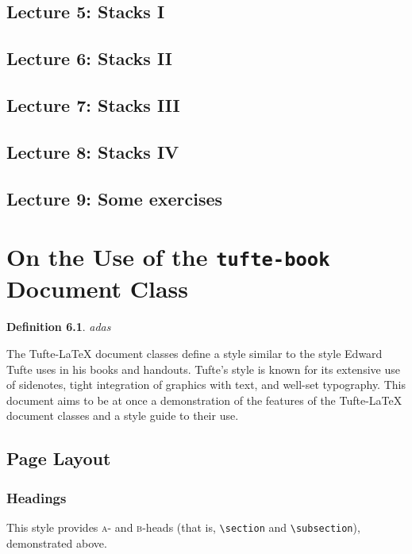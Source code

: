 \documentclass{tufte-book} %
\newcommand{\TL}{Tufte-\LaTeX\xspace}
\numberwithin{dummy}{section}
\newtheorem{dfn}[thm]{Definition}
\begin{document}
\section{Lecture 5: Stacks I}
\section{Lecture 6: Stacks II}
\section{Lecture 7: Stacks III}
\section{Lecture 8: Stacks IV}
\section{Lecture 9: Some exercises}
\chapter[On the Use of the tufte-book Document Class]{On the Use of the \texttt{tufte-book} Document Class}
\label{ch:tufte-book}

\begin{dfn}
adas
\end{dfn}
The \TL document classes define a style similar to the style Edward Tufte uses in his books and handouts. Tufte's style is known for its extensive use of sidenotes, tight integration of graphics with text, and well-set typography. This document aims to be at once a demonstration of the features of the \TL document classes and a style guide to their use.


\section{Page Layout}\label{sec:page-layout}
\subsection{Headings}\label{sec:headings}
This style provides \textsc{a}- and \textsc{b}-heads (that is, \Verb|\section| and \Verb|\subsection|), demonstrated above.
\end{document}
